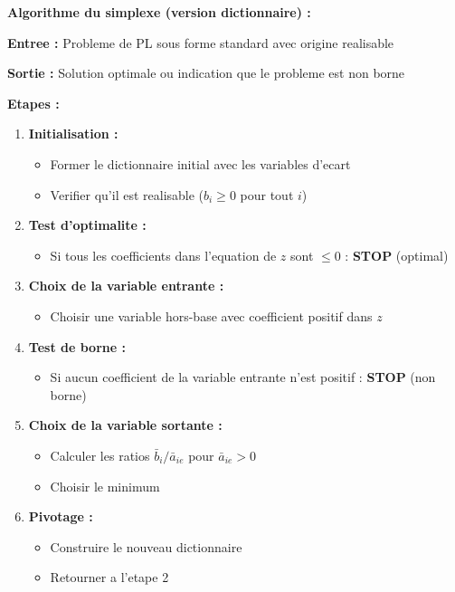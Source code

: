 \documentclass[12pt,a4paper]{article}
\begin{document}
\begin{important}
\textbf{Algorithme du simplexe (version dictionnaire) :}

\textbf{Entree :} Probleme de PL sous forme standard avec origine realisable

\textbf{Sortie :} Solution optimale ou indication que le probleme est non borne

\textbf{Etapes :}
\begin{enumerate}
    \item \textcolor{titrebleu}{\textbf{Initialisation :}}
    \begin{itemize}
        \item Former le dictionnaire initial avec les variables d'ecart
        \item Verifier qu'il est realisable ($b_i \geq 0$ pour tout $i$)
    \end{itemize}
    
    \item \textcolor{defvert}{\textbf{Test d'optimalite :}}
    \begin{itemize}
        \item Si tous les coefficients dans l'equation de $z$ sont $\leq 0$ : \textbf{STOP} (optimal)
    \end{itemize}
    
    \item \textcolor{algoviolet}{\textbf{Choix de la variable entrante :}}
    \begin{itemize}
        \item Choisir une variable hors-base avec coefficient positif dans $z$
    \end{itemize}
    
    \item \textcolor{exempleorange}{\textbf{Test de borne :}}
    \begin{itemize}
        \item Si aucun coefficient de la variable entrante n'est positif : \textbf{STOP} (non borne)
    \end{itemize}
    
    \item \textcolor{importantrouge}{\textbf{Choix de la variable sortante :}}
    \begin{itemize}
        \item Calculer les ratios $\bar{b}_i / \bar{a}_{ie}$ pour $\bar{a}_{ie} > 0$
        \item Choisir le minimum
    \end{itemize}
    
    \item \textcolor{titrebleu}{\textbf{Pivotage :}}
    \begin{itemize}
        \item Construire le nouveau dictionnaire
        \item Retourner a l'etape 2
    \end{itemize}
\end{enumerate}
\end{important}
\end{document}

